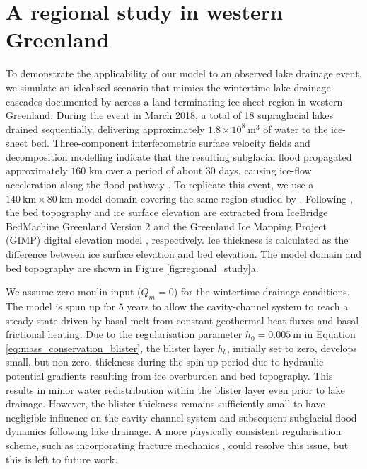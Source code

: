 \documentclass[draft]{agujournal2019}
\newcommand{\figref}[1]{Figure \ref{#1}}
\newcommand{\eqnref}[1]{Equation \ref{#1}}
\begin{document}
\section{A regional study in western Greenland}\label{sec:regional_study}
To demonstrate the applicability of our model to an observed lake drainage event, we simulate an idealised scenario that mimics the wintertime lake drainage cascades documented by  across a land-terminating ice-sheet region in western Greenland. During the event in March 2018, a total of 18 supraglacial lakes drained sequentially, delivering approximately $1.8\times10^{8}~\text{m}^3$ of water to the ice-sheet bed. Three-component interferometric surface velocity fields and decomposition modelling indicate that the resulting subglacial flood propagated approximately $160$ km over a period of about $30$ days, causing ice-flow acceleration along the flood pathway \cite{maier2023Wintertime}. To replicate this event, we use a $140~\text{km}\times80~\text{km}$ model domain covering the same region studied by . Following , the bed topography and ice surface elevation are extracted from IceBridge BedMachine Greenland Version 2 \cite{morlighem2014Deeply} and the Greenland Ice Mapping Project (GIMP) digital elevation model \cite{howat2014Greenland}, respectively. Ice thickness is calculated as the difference between ice surface elevation and bed elevation. The model domain and bed topography are shown in \figref{fig:regional_study}a.

We assume zero moulin input ($Q_m=0$) for the wintertime drainage conditions. The model is spun up for $5$ years to allow the cavity-channel system to reach a steady state driven by basal melt from constant geothermal heat fluxes and basal frictional heating. Due to the regularisation parameter $h_0=0.005~\text{m}$ in \eqnref{eq:mass_conservation_blister}, the blister layer $h_b$, initially set to zero, develops small, but non-zero, thickness during the spin-up period due to hydraulic potential gradients resulting from ice overburden and bed topography. This results in minor water redistribution within the blister layer even prior to lake drainage. However, the blister thickness remains sufficiently small to have negligible influence on the cavity-channel system and subsequent subglacial flood dynamics following lake drainage. A more physically consistent regularisation scheme, such as incorporating fracture mechanics \cite{lister2019Viscous}, could resolve this issue, but this is left to future work.
\end{document}
